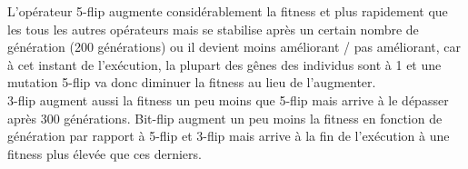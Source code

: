 \documentclass[12pt]{article}
\begin{document}
\begin{itemize}
L'opérateur 5-flip augmente considérablement la fitness et plus rapidement que les tous les autres opérateurs mais se stabilise après un certain nombre de génération (200 générations) ou il devient moins améliorant / pas améliorant, car à cet instant de l'exécution, la plupart des gênes des individus sont à 1 et une mutation 5-flip va donc diminuer la fitness au lieu de l'augmenter.\\

3-flip augment aussi la fitness un peu moins que 5-flip mais arrive à le dépasser après 300 générations. Bit-flip augment un peu moins la fitness en fonction de génération par rapport à 5-flip et 3-flip mais arrive à la fin de l'exécution à une fitness plus élevée que ces derniers.

\end{itemize}
\end{document}
